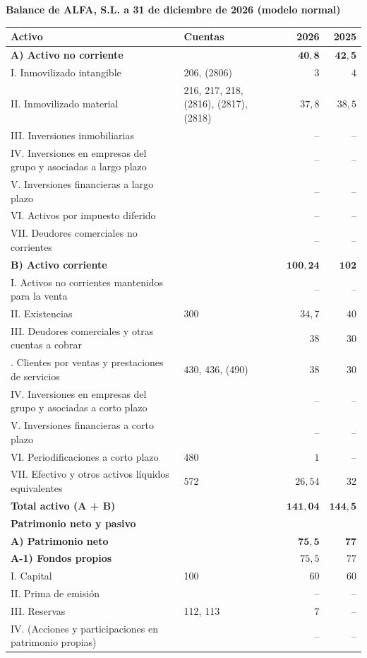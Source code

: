 \documentclass[10pt,a4paper]{article}
\begin{document}
\begin{center}\begin{minipage}{\linewidth}\centering
{\small\textbf{Balance de ALFA, S.L. a 31 de diciembre de 2026 (modelo normal)}}\par\vspace{0.3em}
{\footnotesize
\begin{tabular}{p{8.1cm} p{3.4cm} r r}
\hline
\textbf{Activo} & \textbf{Cuentas} & \textbf{2026} & \textbf{2025} \\
\hline
\textbf{A) Activo no corriente} & & $\mathbf{40,8}$ & $\mathbf{42,5}$ \tabularnewline
\quad I. Inmovilizado intangible & \raggedright 206, (2806) & $3$ & $4$ \tabularnewline
\quad II. Inmovilizado material & \raggedright 216, 217, 218, (2816), (2817), (2818) & $37,8$ & $38,5$ \tabularnewline
\quad III. Inversiones inmobiliarias & & -- & -- \tabularnewline
\quad IV. Inversiones en empresas del grupo y asociadas a largo plazo & & -- & -- \tabularnewline
\quad V. Inversiones financieras a largo plazo & & -- & -- \tabularnewline
\quad VI. Activos por impuesto diferido & & -- & -- \tabularnewline
\quad VII. Deudores comerciales no corrientes & & -- & -- \tabularnewline
\textbf{B) Activo corriente} & & $\mathbf{100,24}$ & $\mathbf{102}$ \tabularnewline
\quad I. Activos no corrientes mantenidos para la venta & & -- & -- \tabularnewline
\quad II. Existencias & \raggedright 300 & $34,7$ & $40$ \tabularnewline
\quad III. Deudores comerciales y otras cuentas a cobrar & & $38$ & $30$ \tabularnewline
\qquad 1. Clientes por ventas y prestaciones de servicios & \raggedright 430, 436, (490) & $38$ & $30$ \tabularnewline
\quad IV. Inversiones en empresas del grupo y asociadas a corto plazo & & -- & -- \tabularnewline
\quad V. Inversiones financieras a corto plazo & & -- & -- \tabularnewline
\quad VI. Periodificaciones a corto plazo & \raggedright 480 & $1$ & -- \tabularnewline
\quad VII. Efectivo y otros activos líquidos equivalentes & \raggedright 572 & $26,54$ & $32$ \tabularnewline
\textbf{Total activo (A + B)} & & $\mathbf{141,04}$ & $\mathbf{144,5}$ \tabularnewline
\hline
\textbf{Patrimonio neto y pasivo} & & & \\
\hline
\textbf{A) Patrimonio neto} & & $\mathbf{75,5}$ & $\mathbf{77}$ \tabularnewline
\quad \textbf{A-1) Fondos propios} & & $75,5$ & $77$ \tabularnewline
\qquad I. Capital & \raggedright 100 & $60$ & $60$ \tabularnewline
\qquad II. Prima de emisión & & -- & -- \tabularnewline
\qquad III. Reservas & \raggedright 112, 113 & $7$ & -- \tabularnewline
\qquad IV. (Acciones y participaciones en patrimonio propias) & & -- & -- \tabularnewline

\end{tabular}}
\end{minipage}
\end{center}
\end{document}
